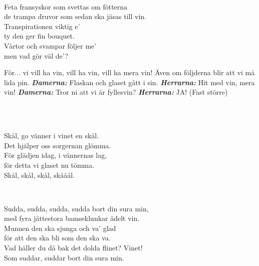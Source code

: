 

 \\       

\songtext{} 
Feta fransyskor som svettas om fötterna  \\ 
de trampa druvor som sedan ska jäsas till vin.  \\ 
Transpirationen viktig e' \\ 
ty den ger fin bouquet. \\ 
Vårtor och svampar följer me' \\ 
men vad gör väl de'? 

För... vi vill ha vin, vill ha vin, vill ha mera vin! 
Även om följderna blir att vi må lida pin.
\textbf{\textit{Damerna:}} Flaskan och glaset gått i sin. 
\textbf{\textit{Herrarna:}} Hit med vin, mera vin!
\textbf{\textit{Damerna:}} Tror ni att vi är fyllesvin?
\textbf{\textit{Herrarna:}} JA! (Fast större) 

 \\


 \\ 
\author{Text: Carl Sebardt}

\leftrepeat \songtext{}Skål, go vänner i vinet en skål.\\
Det hjälper oss sorgernan glömma.\\
För glädjen idag, i vännernas lag,\\
för detta vi glaset nu tömma. \rightrepeat\\
Skål, skål, skål, skååål.\\

\newpage

 \\       

\songtext{} 
Sudda, sudda, sudda, sudda bort din sura min,\\   
med fyra jättestora bamseklunkar ädelt vin.\\   
Munnen den ska sjunga och va' glad\\   
för att den ska bli som den ska va.\\   
Vad häller du då bak det dolda flinet? Vinet!\\   
Som suddar, suddar bort din sura min.\\   




